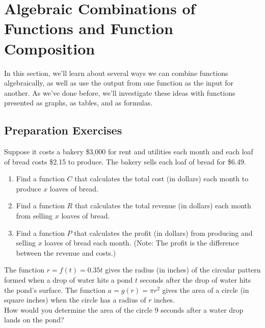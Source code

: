 
\section{Algebraic Combinations of Functions and Function Composition} \label{functions-algebra-and-composition}

In this section, we'll learn about several ways we can combine functions algebraically, as well as use the output from one function as the input for another.  As we've done before, we'll investigate these ideas with functions presented as graphs, as tables, and as formulas.  \\[0.5em]



\subsection*{Preparation Exercises } \label{prep-functions-algebra-and-composition}

\begin{myPrep}
Suppose it costs a bakery \$3,000 for rent and utilities each month and each loaf of bread costs \$2.15 to produce.  The bakery sells each loaf of bread for \$6.49.
	\begin{enumerate}
		\item Find a function $C$ that calculates the total cost (in dollars) each month to produce $x$ loaves of bread.
		\vfill
		\item Find a function $R$ that calculates the total revenue (in dollars) each month from selling $x$ loaves of bread.
		\vfill
		\item Find a function $P$ that calculates the profit (in dollars) from producing and selling $x$ loaves of bread each month.  (Note: The profit is the difference between the revenue and costs.)
		\vfill
	\end{enumerate}
\end{myPrep}

\begin{myPrep}
The function $r=f(t)=0.35t$ gives the radius (in inches) of the circular pattern formed when a drop of water hits a pond $t$ seconds after the drop of water hits the pond's surface.  The function $a = g(r) = \pi r^2$ gives the area of a circle (in square inches) when the circle has a radius of $r$ inches.\\[0.5em]
How would you determine the area of the circle 9 seconds after a water drop lands on the pond?
\vfill
\end{myPrep}


